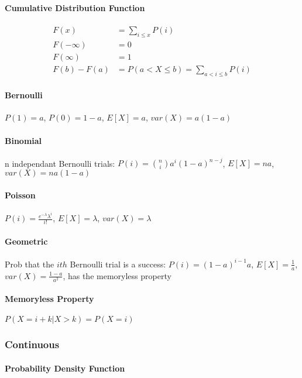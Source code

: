 \paragraph{Cumulative Distribution Function}
\begin{align*}
	F(x)       &= \sum_{i \le x} P(i) \\
	F(-\infty) &= 0 \\
	F(\infty)  &= 1 \\
	F(b)-F(a)  &= P(a < X \le b) = \sum_{a<i \le b} P(i)
\end{align*}

\paragraph{Bernoulli} $P(1) = a$, $P(0) = 1-a$, $E[X] = a$, $var(X) = a(1-a)$
\paragraph{Binomial} n independant Bernoulli trials:
$P(i) = {n \choose i} a^i(1-a)^{n-j}$,
$E[X] = na$,
$var(X) = na(1-a)$
\paragraph{Poisson} $P(i) = \frac{e^{-\lambda} \lambda^i}{i!}$, 
$E[X] = \lambda$, 
$var(X) = \lambda$
\paragraph{Geometric} Prob that the $i{th}$ Bernoulli trial is a success:
$P(i) = (1-a)^{i-1}a$,
$E[X] = \frac{1}{a}$,
$var(X) = \frac{1-a}{a^2}$,
has the memoryless property
\paragraph{Memoryless Property} $P(X=i+k|X>k) = P(X=i)$

\subsubsection{Continuous}
\paragraph{Probability Density Function}
\paragraph{}
\paragraph{}
\paragraph{}











